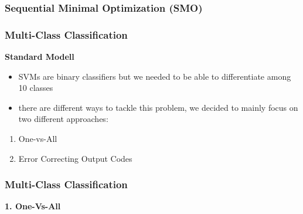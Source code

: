 \documentclass[10pt, compress]{beamer}
\begin{document}
\begin{frame}
\frametitle{Sequential Minimal Optimization (SMO)}

\end{frame}


\begin{frame}
\frametitle{Multi-Class Classification}

\textbf{Standard Modell}
\begin{itemize}
\item SVMs are binary classifiers but we needed to be able to differentiate among 10 classes
\item there are different ways to tackle this problem, we decided to mainly focus on two different approaches: 
\end{itemize}
\begin{enumerate}
\item One-vs-All 
\item Error Correcting Output Codes
\end{enumerate}
\end{frame}



\begin{frame}[fragile]
\frametitle{Multi-Class Classification}

\textbf{\alert{1. One-Vs-All}}

\end{frame}
\end{document}
